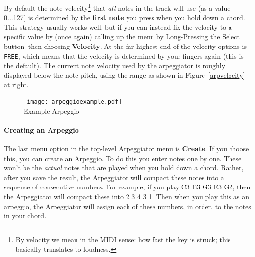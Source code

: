 \documentclass{article}
\begin{document}
By default the note velocity\footnote{By velocity we mean in the MIDI sense: how fast the key is struck; this basically translates to loudness.} that {\it all} notes in the track will use (as a value 0...127) is determined by the {\bf first note} you press when you hold down a chord.  This strategy usually works well, but if you can instead fix the velocity to a specific value by (once again) calling up the menu by Long-Pressing the Select button, then choosing {\bf Velocity}.  At the far highest end of the velocity options is \texttt{FREE}, which means that the velocity is determined by your fingers again (this is the default). The current note velocity used by the arpeggiator is roughly displayed below the note pitch, using the range as shown in Figure~\ref{arpvelocity} at right.
%
\begin{figure}
\begin{center}
\vspace{-1em}
\texttt{[image: arpeggioexample.pdf]}\\
Example Arpeggio\\[2em]
\end{center}
\vspace{-2em}
\label{arpeggioediting}
\end{figure}
%
\paragraph{Creating an Arpeggio}

The last menu option in the top-level Arpeggiator menu is {\bf Create}.  If you choose this, you can create an Arpeggio.  To do this you enter notes one by one.  These won't be the {\it actual} notes that are played when you hold down a chord.  Rather, after you save the result, the Arpeggiator will compact these notes into a sequence of consecutive numbers.  For example, if you play C3 E3 G3 E3 G2, then the Arpeggiator will compact these into 2 3 4 3 1.  Then when you play this as an arpeggio, the Arpeggiator will assign each of these numbers, in order, to the notes in your chord. 
\end{document}
